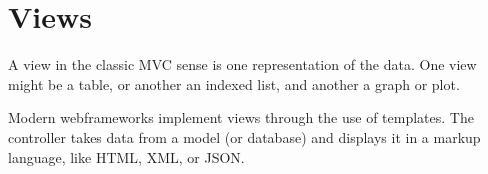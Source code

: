 \chapter{Views}

A view in the classic MVC sense is one representation of the data. One
view might be a table, or another an indexed list, and another a graph
or plot.

Modern webframeworks implement views through the use of templates. The
controller takes data from a model (or database) and displays it in
a markup language, like HTML, XML, or JSON.
